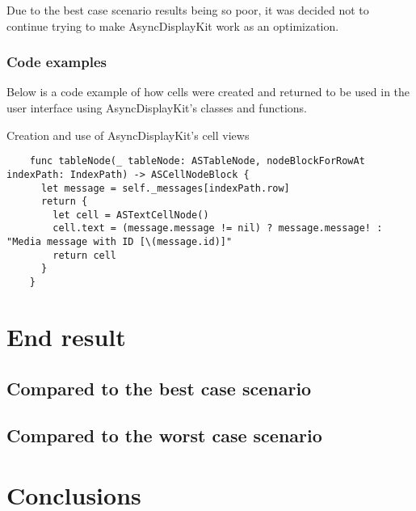 \documentclass[a4paper,12pt]{article}
\begin{document}
Due to the best case scenario results being so poor, it was decided not to continue trying to make AsyncDisplayKit work as an optimization.

\subsubsection*{Code examples}
Below is a code example of how cells were created and returned to be used in the user interface using AsyncDisplayKit's classes and functions.
\begin{listing}[H]
  \caption{Creation and use of AsyncDisplayKit's cell views}
  \begin{verbatim}
    func tableNode(_ tableNode: ASTableNode, nodeBlockForRowAt indexPath: IndexPath) -> ASCellNodeBlock {
      let message = self._messages[indexPath.row]
      return {
        let cell = ASTextCellNode()
        cell.text = (message.message != nil) ? message.message! : "Media message with ID [\(message.id)]"
        return cell
      }
    }
  \end{verbatim}
\end{listing}

\newpage
\section{End result}
\subsection{Compared to the best case scenario}

\subsection{Compared to the worst case scenario}

\newpage
\section{Conclusions}


\newpage
{}
{}
\listoffigures

\newpage
{}
{}


\end{document}
